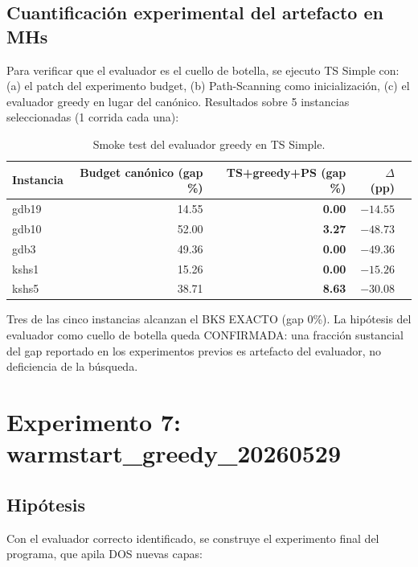 \subsection{Cuantificación experimental del artefacto en MHs}

Para verificar que el evaluador es el cuello de botella, se ejecuto
TS Simple con: (a) el patch del experimento budget, (b) Path-Scanning
como inicialización, (c) el evaluador greedy en lugar del canónico.
Resultados sobre 5 instancias seleccionadas (1 corrida cada una):

\begin{table}[h]
\centering
\caption{Smoke test del evaluador greedy en TS Simple.}
\label{tab:smoke-greedy-ts}
\small
\begin{tabular}{lrrrr}
\toprule
Instancia & Budget canónico (gap \%) & TS+greedy+PS (gap \%) & $\Delta$ (pp) \\
\midrule
gdb19 & 14.55 & \textbf{0.00} & $-14.55$ \\
gdb10 & 52.00 & \textbf{3.27} & $-48.73$ \\
gdb3  & 49.36 & \textbf{0.00} & $-49.36$ \\
kshs1 & 15.26 & \textbf{0.00} & $-15.26$ \\
kshs5 & 38.71 & \textbf{8.63} & $-30.08$ \\
\bottomrule
\end{tabular}
\end{table}

Tres de las cinco instancias alcanzan el BKS EXACTO (gap 0\%). La
hipótesis del evaluador como cuello de botella queda CONFIRMADA: una
fracción sustancial del gap reportado en los experimentos previos es
artefacto del evaluador, no deficiencia de la búsqueda.

\section{Experimento 7: warmstart\_greedy\_20260529}
\label{sec:warmstart-greedy}

\subsection{Hipótesis}

Con el evaluador correcto identificado, se construye el experimento
final del programa, que apila DOS nuevas capas:

